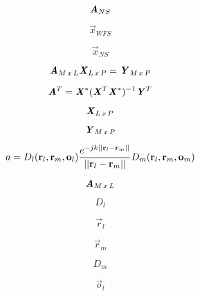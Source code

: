 \documentclass[10pt]{report}
\begin{document}
\begin{equation*}
	\bm{\mathit{A}}_{NS}
\end{equation*}

\begin{equation*}
	\vec{x}_{WFS}
\end{equation*}

\begin{equation*}
	\vec{x}_{NS}
\end{equation*}
	
	
\begin{equation*}
	\bm{\mathit{A}}_{M \, x \, L} \bm{\mathit{X}}_{L \, x \, P} = \bm{\mathit{Y}}_{M \, x \, P}
\end{equation*}

\begin{equation*}
	\bm{\mathit{A}}^T = \bm{\mathit{X}}^{*} (\bm{\mathit{X}}^T \bm{\mathit{X}}^{*})^{-1}  \bm{\mathit{Y}}^T
\end{equation*}

\begin{equation*}
	\bm{\mathit{X}}_{L \, x \, P}
\end{equation*}

\begin{equation*}
	\bm{\mathit{Y}}_{M \, x \, P}
\end{equation*}

\begin{equation*}
a = D_{l}(\mathbf{r}_{l}, \mathbf{r}_{m}, \mathbf{o}_{l}) \frac{e^{-j k || \mathbf{r}_{l} - \mathbf{r}_{m} ||}}{|| \mathbf{r}_{l} - \mathbf{r}_{m} ||} D_{m}(\mathbf{r}_{l}, \mathbf{r}_{m}, \mathbf{o}_{m})
\end{equation*}
	
\begin{equation*}
	\bm{\mathit{A}}_{M \, x \, L}
\end{equation*}

\begin{equation*}
	D_{l}
\end{equation*}

\begin{equation*}
	\vec{r}_{l}
\end{equation*}

\begin{equation*}
	\vec{r}_{m}
\end{equation*}

\begin{equation*}
	D_{m}
\end{equation*}

\begin{equation*}
	\vec{o}_{l}
\end{equation*}
\end{document}
